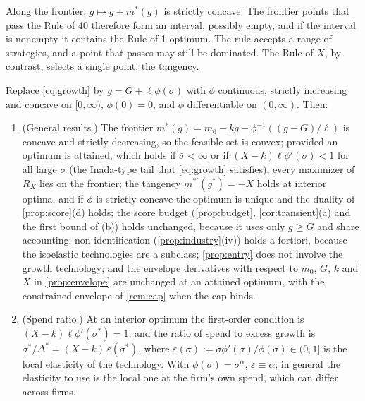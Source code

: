 \begin{remark}\label{rem:r40}
Along the frontier, $g\mapsto g+m^*(g)$ is strictly concave. The frontier points that pass the Rule of 40 therefore form an interval, possibly empty, and if the interval is nonempty it contains the Rule-of-1 optimum. The rule accepts a range of strategies, and a point that passes may still be dominated. The Rule of $X$, by contrast, selects a single point: the tangency.
\end{remark}

\begin{remark}\label{rem:general-phi}
Replace \eqref{eq:growth} by $g=G+\ell\phi(\sigma)$ with $\phi$ continuous, strictly increasing and concave on $[0,\infty)$, $\phi(0)=0$, and $\phi$ differentiable on $(0,\infty)$. Then:
\begin{enumerate}
\item[(a)] (General results.) The frontier $m^*(g)=m_0-kg-\phi^{-1}((g-G)/\ell)$ is concave and strictly decreasing, so the feasible set is convex; provided an optimum is attained, which holds if $\bar\sigma<\infty$ or if $(X-k)\ell\phi'(\sigma)<1$ for all large $\sigma$ (the Inada-type tail that \eqref{eq:growth} satisfies), every maximizer of $R_X$ lies on the frontier; the tangency $m^{*\prime}(g^*)=-X$ holds at interior optima, and if $\phi$ is strictly concave the optimum is unique and the duality of \autoref{prop:score}(d) holds; the score budget (\autoref{prop:budget}, \autoref{cor:transient}(a) and the first bound of (b)) holds unchanged, because it uses only $g\ge G$ and share accounting; non-identification (\autoref{prop:industry}(iv)) holds a fortiori, because the isoelastic technologies are a subclass; \autoref{prop:entry} does not involve the growth technology; and the envelope derivatives with respect to $m_0$, $G$, $k$ and $X$ in \autoref{prop:envelope} are unchanged at an attained optimum, with the constrained envelope of \autoref{rem:cap} when the cap binds.
\item[(b)] (Spend ratio.) At an interior optimum the first-order condition is $(X-k)\ell\phi'(\sigma^*)=1$, and the ratio of spend to excess growth is $\sigma^*/\Delta^*=(X-k)\,\varepsilon(\sigma^*)$, where $\varepsilon(\sigma):=\sigma\phi'(\sigma)/\phi(\sigma)\in(0,1]$ is the local elasticity of the technology. With $\phi(\sigma)=\sigma^\alpha$, $\varepsilon\equiv\alpha$; in general the elasticity to use is the local one at the firm's own spend, which can differ across firms.

\end{enumerate}
\end{remark}
